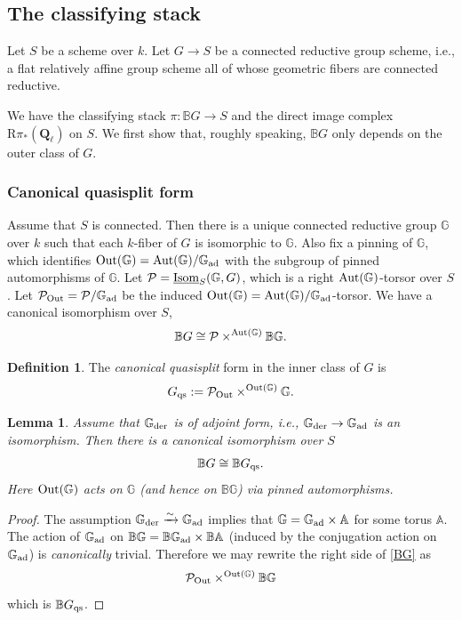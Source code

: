\documentclass[reqno]{amsart}
\numberwithin{equation}{subsection}
\newtheorem{lemma}[subsubsection]{Lemma}
\theoremstyle{definition}
\newtheorem{defn}[subsubsection]{Definition}
\def\AA{\mathbb{A}}
\def\BB{\mathbb{B}}
\def\GG{\mathbb{G}}
\newcommand\cP{\mathcal{P}}
\newcommand\Out{\textup{Out}}
\newcommand\Aut{\textup{Aut}}
\newcommand\Isom{\textup{Isom}}
\newcommand{\ad}{\textup{ad}}
\newcommand{\der}{\textup{der}}
\newcommand{\Ql}{\Q_{\ell}}
\newcommand\un{\underline}
\newcommand\qs{\textup{qs}}
\newcommand{\Q}{\mathbf{Q}}
\newcommand{\co}{\colon}
\newcommand{\rR}{\ensuremath{\mathrm{R}}\xspace}
\begin{document}
\subsection{The classifying stack}

Let $S$ be a scheme over $k$. Let $G\to S$ be a connected reductive group scheme, i.e., a flat relatively affine group scheme all of whose geometric fibers are connected reductive. 

We have the classifying stack $\pi \co \BB G \rightarrow S$ and the direct image complex $\rR \pi_* (\Ql)$ on $S$.  We first show that, roughly speaking, $\BB G$ only depends on the outer class of $G$.

\subsubsection{Canonical quasisplit form}\label{sssec:canonical-quasisplit-form}
Assume that $S$ is connected. Then there is a unique connected reductive group $\GG$ over $k$ such that each $k$-fiber of $G$ is isomorphic to $\GG$. Also fix a pinning of $\GG$, which identifies $\Out(\GG)=\Aut(\GG)/\GG_{\ad}$ with the subgroup of pinned automorphisms of $\GG$. Let $\cP=\un{\Isom}_{S}(\GG, G)$, which is a right $\Aut(\GG)$-torsor over $S$. Let $\cP_{\Out}=\cP/\GG_{\ad}$ be the induced $\Out(\GG)=\Aut(\GG)/\GG_{\ad}$-torsor. We have a canonical isomorphism over $S$,
\begin{equation}\label{BG}
\BB G\cong \cP\times^{\Aut(\GG)}\BB\GG.
\end{equation}

\begin{defn}\label{defn:quasisplit-form} The \emph{canonical quasisplit} form in the inner class of $G$ is
\begin{equation*}
G_{\qs}:=\cP_{\Out}\times^{\Out(\GG)}\GG.
\end{equation*}
\end{defn}

\begin{lemma}\label{l:BG qs}
Assume that $\GG_{\der}$ is of adjoint form, i.e., $\GG_{\der}\to \GG_{\ad}$ is an isomorphism. Then there is a canonical isomorphism over $S$
\begin{equation*}
\BB G\cong \BB G_{\qs}.
\end{equation*}
Here $\Out(\GG)$ acts on $\GG$ (and hence on $\BB\GG$) via pinned automorphisms.
\end{lemma}
\begin{proof}
The assumption $\GG_{\der} \xrightarrow{\sim} \GG_{\ad}$ implies that $\GG=\GG_{\ad}\times \AA$ for some torus $\AA$. The action of $\GG_{\ad}$ on $\BB\GG=\BB\GG_{\ad}\times\BB\AA$ (induced by the conjugation action on $\GG_{\ad}$) is {\em canonically} trivial. Therefore we may rewrite the right side of \eqref{BG} as
\begin{equation*}
\cP_{\Out}\times^{\Out(\GG)}\BB\GG
\end{equation*}
which is $\BB G_{\qs}$.
\end{proof}
\end{document}
